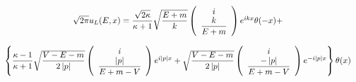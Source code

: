 \begin{equation}
\begin{array}{c}
\sqrt{2\pi }u_L(E,x)=%
{\displaystyle {\sqrt{2\kappa } \over \kappa +1}}
\sqrt{%
{\displaystyle {E+m \over k}}
}\left( 
\begin{array}{c}
i \\ 
{\displaystyle {k \over E+m}}
\end{array}
\right) e^{ikx}\theta (-x)+ \\ 
\\ 
\left\{ 
{\displaystyle {\kappa -1 \over \kappa +1}}
\sqrt{%
{\displaystyle {V-E-m \over 2\left| p\right| }}
}\left( 
\begin{array}{c}
i \\ 
{\displaystyle {\left| p\right|  \over E+m-V}}
\end{array}
\right) e^{i\left| p\right| x}+\sqrt{%
{\displaystyle {V-E-m \over 2\left| p\right| }}
}\left( 
\begin{array}{c}
i \\ 
{\displaystyle {-\left| p\right|  \over E+m-V}}
\end{array}
\right) e^{-i\left| p\right| x}\right\} \theta (x)
\end{array}
\label{w1}
\end{equation}

